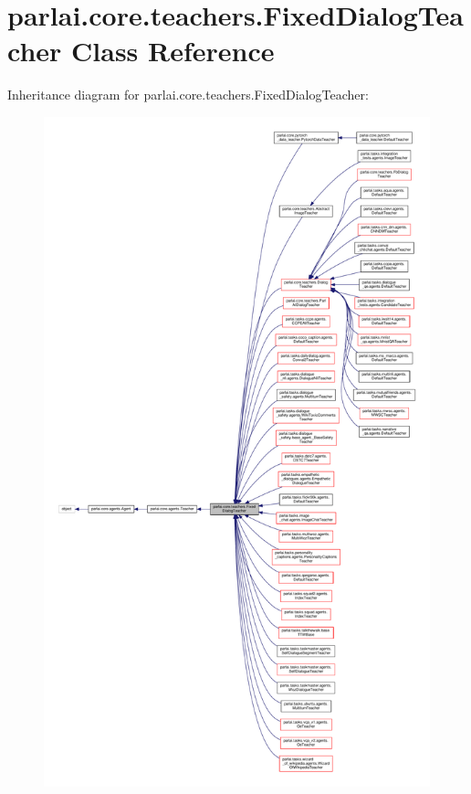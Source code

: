 \hypertarget{classparlai_1_1core_1_1teachers_1_1FixedDialogTeacher}{}\section{parlai.\+core.\+teachers.\+Fixed\+Dialog\+Teacher Class Reference}
\label{classparlai_1_1core_1_1teachers_1_1FixedDialogTeacher}


Inheritance diagram for parlai.\+core.\+teachers.\+Fixed\+Dialog\+Teacher\+:
\nopagebreak
\begin{figure}[H]
\begin{center}
\leavevmode
\includegraphics[height=550pt]{classparlai_1_1core_1_1teachers_1_1FixedDialogTeacher__inherit__graph}
\end{center}
\end{figure}


